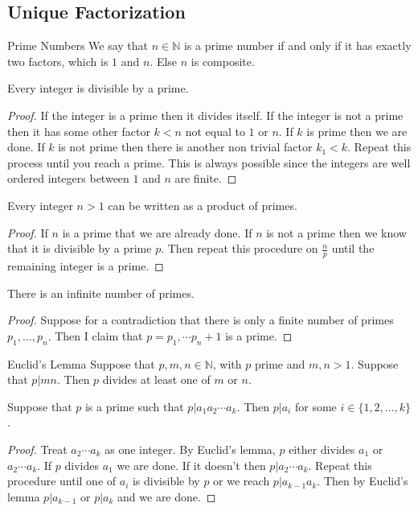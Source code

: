 \subsection{Unique Factorization}
\begin{defn}{Prime Numbers}{} We say that $n\in\mathbb{N}$ is a prime number if and only if it has exactly two factors, which is $1$ and $n$. Else $n$ is composite. 
\end{defn}

\begin{lmm}{}{} Every integer is divisible by a prime. \tcbline
\begin{proof}
If the integer is a prime then it divides itself. If the integer is not a prime then it has some other factor $k<n$ not equal to $1$ or $n$. If $k$ is prime then we are done. If $k$ is not prime then there is another non trivial factor $k_1<k$. Repeat this process until you reach a prime. This is always possible since the integers are well ordered integers between $1$ and $n$ are finite. 
\end{proof}
\end{lmm}

\begin{lmm}{}{} Every integer $n>1$ can be written as a product of primes. \tcbline
\begin{proof}
If $n$ is a prime that we are already done. If $n$ is not a prime then we know that it is divisible by a prime $p$. Then repeat this procedure on $\frac{n}{p}$ until the remaining integer is a prime. 
\end{proof}
\end{lmm}

\begin{thm}{}{} There is an infinite number of primes. \tcbline
\begin{proof}
Suppose for a contradiction that there is only a finite number of primes $p_1,\dots,p_n$. Then I claim that $p=p_1,\cdots p_n+1$ is a prime. 
\end{proof}
\end{thm}

\begin{prp}{Euclid's Lemma}{} Suppose that $p,m,n\in\mathbb{N}$, with $p$ prime and $m,n>1$. Suppose that $p|mn$. Then $p$ divides at least one of $m$ or $n$. 
\end{prp}

\begin{prp}{}{} Suppose that $p$ is a prime such that $p|a_1a_2\cdots a_k$. Then $p|a_i$ for some $i\in\{1,2,\dots,k\}$. \tcbline
\begin{proof}
Treat $a_2\cdots a_k$ as one integer. By Euclid's lemma, $p$ either divides $a_1$ or $a_2\cdots a_k$. If $p$ divides $a_1$ we are done. If it doesn't then $p|a_2\cdots a_k$. Repeat this procedure until one of $a_i$ is divisible by $p$ or we reach $p|a_{k-1}a_k$. Then by Euclid's lemma $p|a_{k-1}$ or $p|a_k$ and we are done. 
\end{proof}
\end{prp}

